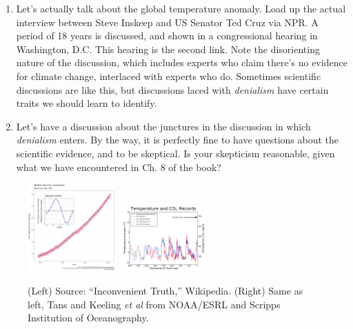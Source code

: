\documentclass{article}
\begin{document}
\begin{enumerate}
\item Let's actually talk about the global temperature anomaly.  Load up the actual interview between Steve Inskeep and US Senator Ted Cruz via NPR.  A period of 18 years is discussed, and shown in a congressional hearing in Washington, D.C.  This hearing is the second link.  Note the disorienting nature of the discussion, which includes experts who claim there's no evidence for climate change, interlaced with experts who do.  Sometimes scientific discussions are like this, but discussions laced with \textit{denialism} have certain traits we should learn to identify.
\item Let's have a discussion about the junctures in the discussion in which \textit{denialism} enters.  By the way, it is perfectly fine to have questions about the scientific evidence, and to be skeptical.  Is your skepticism reasonable, given what we have encountered in Ch. 8 of the book?
\end{enumerate}
\small
\begin{figure}
\centering
\includegraphics[width=0.3\textwidth]{figures/climate1.png} \hspace{0.5cm}
\includegraphics[width=0.3\textwidth]{figures/climate2.png} \hspace{0.5cm}
\caption{\label{fig:1} (Left) Source: ``Inconvenient Truth,'' Wikipedia. (Right) Same as left, Tans and Keeling \textit{et al} from NOAA/ESRL and Scripps Institution of Oceanography.}
\end{figure}
\end{document}
